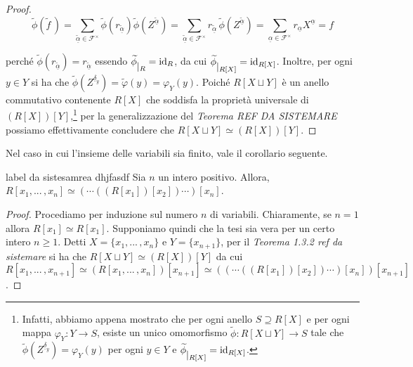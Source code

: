 \begin{proof}
  \[ \widetilde{\phi}(\widetilde{f}\,) = \sum\limits_{\widetilde{\underline{\alpha}}
  \in \mathcal{F}^{\times}} \widetilde{\phi}(r_{\widetilde{\underline{\alpha}}}) \widetilde{\phi}(Z^{\widetilde{\underline{\alpha}}}) 
  = \sum\limits_{\widetilde{\underline{\alpha}}\in \mathcal{F}^{\times}} r_{\widetilde{\underline{\alpha}}}\,\widetilde{\phi}(Z^{\widetilde{\underline{\alpha}}}) 
  = \sum\limits_{\underline{\alpha}\in \mathcal{F}^{\times}} r_{\underline{\alpha}} X^{\underline{\alpha}} = f \] 
  
  perché $\widetilde{\phi}(r_{\widetilde{\underline{\alpha}}})=r_{\widetilde{\underline{\alpha}}}$ essendo 
  $\widetilde{\phi} \raisebox{-.5em}{$\vert_{R}$}= \operatorname{id}_R$, da cui $\widetilde{\phi} \raisebox{-.5em}{$\vert_{R[X]}$}=\operatorname{id}_{R[X]}$. 
  Inoltre, per ogni $y\in Y$ si ha che $\widetilde{\phi}(Z^{\underline{\delta}_y})=\widetilde{\varphi}(y)=\varphi_Y(y)$. 
  Poiché $R[X\sqcup Y]$ è un anello commutativo contenente $R[X]$ che soddisfa la proprietà universale di $(R[X])[Y]$,\footnote{Infatti, 
  abbiamo appena mostrato che per ogni anello $S\supseteq R[X]$ e per ogni mappa $\varphi_Y\colon Y\to S$, esiste un unico omomorfismo 
  $\widetilde{\phi}\colon R[X\sqcup Y]\to S$ tale che $\widetilde{\phi}(Z^{\underline{\delta}_y})=\varphi_Y(y)$ 
  per ogni $y\in Y$ e $\widetilde{\phi} \raisebox{-.5em}{$\vert_{R[X]}$}=\operatorname{id}_{R[X]}$.} per la generalizzazione del 
  \emph{Teorema REF DA SISTEMARE} possiamo effettivamente concludere che $R[X \sqcup Y]\simeq (R[X])[Y]$.
\end{proof}
\clearpage

\noindent Nel caso in cui l'insieme delle variabili sia finito, vale il corollario seguente.

\begin{cor}[]{label da sistesamrea dhjfasdf}
  Sia $n$ un intero positivo. Allora, $R[x_1,...\,,x_n]\simeq (\cdots((R[x_1])[x_2])\cdots )[x_n]$.
\end{cor}
\vspace{-4mm}
\begin{proof}
  Procediamo per induzione sul numero $n$ di variabili. Chiaramente, se $n=1$ allora $R[x_1]\simeq R[x_1]$. 
  Supponiamo quindi che la tesi sia vera per un certo intero $n\geq 1.$ Detti $X=\{x_1,...\,,x_n\}$ e $Y=\{x_{n+1}\}$, 
  per il \emph{Teorema 1.3.2 ref da sistemare} si ha che $R[X\sqcup Y]\simeq (R[X])[Y]$ da cui $R[x_1,...\,,x_{n+1}]\simeq 
  (R[x_1,...\,,x_n])[x_{n+1}]\simeq ((\cdots((R[x_1])[x_2])\cdots )[x_n])[x_{n+1}]$.
\end{proof}

